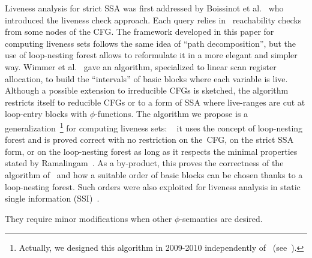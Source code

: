 Liveness analysis for strict SSA was first addressed by Boissinot et
al.~\cite{BoissinotHGDR08} who introduced the liveness check approach.
Each query relies in \reduced\ reachability checks from some nodes of the CFG.
The framework developed in this paper for computing liveness sets follows the same idea of ``path decomposition'', but the use of loop-nesting forest allows to reformulate it in a more elegant and simpler way.
Wimmer et al.~\cite{WimmerF10} gave an algorithm, specialized to linear scan
register allocation, to build the ``intervals'' of basic blocks where each
variable is live. Although a possible extension to irreducible CFGs is
sketched, the algorithm restricts itself to reducible CFGs or to a form of SSA
where live-ranges are cut at loop-entry blocks with $\phi$-functions.  The algorithm
we propose is a generalization~\footnote{Actually, we designed this algorithm
  in 2009-2010 independently of~\cite{WimmerF10} (see~\cite{Boissinot10}).} for computing liveness sets: ~\cite{BoissinotHGDR08}
it uses the concept of loop-nesting forest and is proved correct with no
restriction on the~CFG, on the strict SSA form, or on the loop-nesting forest
as long as it respects the minimal properties stated by
Ramalingam~\cite{ramalingam:2002:loopforest:minimal}. As a by-product, this
proves the correctness of the algorithm of~\cite{WimmerF10} and how a suitable
order of basic blocks can be chosen thanks to a loop-nesting forest. Such
orders were also exploited for liveness analysis in static single information
(SSI)~\cite{BoissinotBDR12}.  


They require minor modifications when other $\phi$-semantics are desired.
